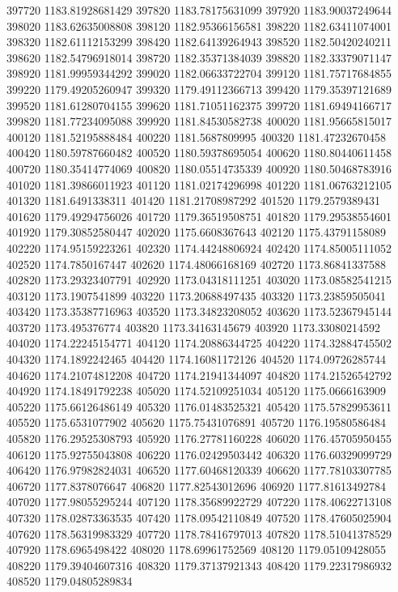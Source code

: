 {397720 1183.81928681429
397820 1183.78175631099
397920 1183.90037249644
398020 1183.62635008808
398120 1182.95366156581
398220 1182.63411074001
398320 1182.61112153299
398420 1182.64139264943
398520 1182.50420240211
398620 1182.54796918014
398720 1182.35371384039
398820 1182.33379071147
398920 1181.99959344292
399020 1182.06633722704
399120 1181.75717684855
399220 1179.49205260947
399320 1179.49112366713
399420 1179.35397121689
399520 1181.61280704155
399620 1181.71051162375
399720 1181.69494166717
399820 1181.77234095088
399920 1181.84530582738
400020 1181.95665815017
400120 1181.52195888484
400220 1181.5687809995
400320 1181.47232670458
400420 1180.59787660482
400520 1180.59378695054
400620 1180.80440611458
400720 1180.35414774069
400820 1180.05514735339
400920 1180.50468783916
401020 1181.39866011923
401120 1181.02174296998
401220 1181.06763212105
401320 1181.6491338311
401420 1181.21708987292
401520 1179.2579389431
401620 1179.49294756026
401720 1179.36519508751
401820 1179.29538554601
401920 1179.30852580447
402020 1175.6608367643
402120 1175.43791158089
402220 1174.95159223261
402320 1174.44248806924
402420 1174.85005111052
402520 1174.7850167447
402620 1174.48066168169
402720 1173.86841337588
402820 1173.29323407791
402920 1173.04318111251
403020 1173.08582541215
403120 1173.1907541899
403220 1173.20688497435
403320 1173.23859505041
403420 1173.35387716963
403520 1173.34823208052
403620 1173.52367945144
403720 1173.495376774
403820 1173.34163145679
403920 1173.33080214592
404020 1174.22245154771
404120 1174.20886344725
404220 1174.32884745502
404320 1174.1892242465
404420 1174.16081172126
404520 1174.09726285744
404620 1174.21074812208
404720 1174.21941344097
404820 1174.21526542792
404920 1174.18491792238
405020 1174.52109251034
405120 1175.0666163909
405220 1175.66126486149
405320 1176.01483525321
405420 1175.57829953611
405520 1175.6531077902
405620 1175.75431076891
405720 1176.19580586484
405820 1176.29525308793
405920 1176.27781160228
406020 1176.45705950455
406120 1175.92755043808
406220 1176.02429503442
406320 1176.60329099729
406420 1176.97982824031
406520 1177.60468120339
406620 1177.78103307785
406720 1177.8378076647
406820 1177.82543012696
406920 1177.81613492784
407020 1177.98055295244
407120 1178.35689922729
407220 1178.40622713108
407320 1178.02873363535
407420 1178.09542110849
407520 1178.47605025904
407620 1178.56319983329
407720 1178.78416797013
407820 1178.51041378529
407920 1178.6965498422
408020 1178.69961752569
408120 1179.05109428055
408220 1179.39404607316
408320 1179.37137921343
408420 1179.22317986932
408520 1179.04805289834
}

